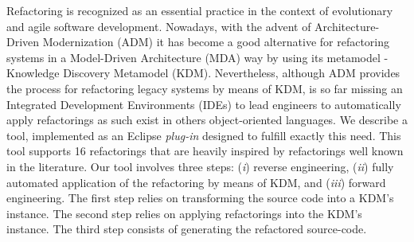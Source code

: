 

Refactoring is recognized as an essential practice in the context of evolutionary and agile software development.
Nowadays, with the advent of Architecture-Driven Modernization (ADM) it has become a good alternative for refactoring systems in a Model-Driven Architecture (MDA) way by using its metamodel - Knowledge Discovery Metamodel (KDM). Nevertheless, although ADM provides the process for refactoring legacy systems by means of KDM, is so far missing an Integrated Development Environments (IDEs) to lead engineers to automatically apply refactorings as such exist in others object-oriented languages. We describe a tool, implemented as an Eclipse \textit{plug-in} designed to fulfill exactly this need. This tool supports 16 refactorings that are heavily inspired by refactorings well known in the literature. Our tool involves three steps: (\textit{i}) reverse engineering, (\textit{ii}) fully automated application of the refactoring by means of KDM, and (\textit{iii}) forward engineering. The first step relies on transforming the source code into a KDM's instance. The second step relies on applying refactorings into the KDM's instance. The third step consists of generating the refactored source-code.




